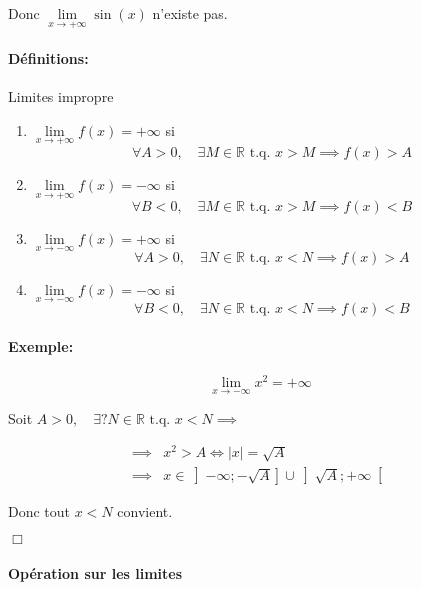 \documentclass[
    11pt,
    a4paper,
    oneside,
    headinlcude, footinclude,
    twoside,
]{report}
\newcommand{\tq}[0]{\textrm{ t.q. }}
\newcommand{\cqfd}[0]{\begin{flushright}$\Box$\end{flushright}}
\begin{document}
Donc $\lim\limits_{x \to + \infty} \sin(x)$  n'existe pas.


\paragraph{Définitions:}

Limites impropre

\begin{enumerate}
\item $\lim\limits_{x \to + \infty} f (x) = + \infty$ si $$\forall A >
0,\quad \exists M \in \mathbb{R} \tq x > M \implies f(x) > A$$

\item $\lim\limits_{x \to + \infty} f (x) = - \infty$ si $$\forall B <
0,\quad \exists M \in \mathbb{R} \tq x > M \implies f(x) < B$$

\item $\lim\limits_{x \to - \infty} f (x) = + \infty$ si $$\forall A >
0,\quad \exists N \in \mathbb{R} \tq x < N \implies f(x) > A$$

\item $\lim\limits_{x \to - \infty} f (x) = - \infty$ si $$\forall B <
0,\quad \exists N \in \mathbb{R} \tq x < N \implies f(x) < B$$
\end{enumerate}

\paragraph{Exemple:}

$$ \lim_{x \to - \infty} x^{2} = + \infty$$

Soit $A > 0, \quad \exists? N \in \mathbb{R} \tq x < N \implies$ 

\[
\begin{split}
\implies & x^{2} > A \iff |x| = \sqrt{A}\\
\implies & x \in \left] - \infty; - \sqrt{A} \right] \cup
\left]\sqrt{A}; + \infty \right[
\end{split}
\]

Donc tout $x < N$ convient. \cqfd

\paragraph{Opération sur les limites}
\end{document}
